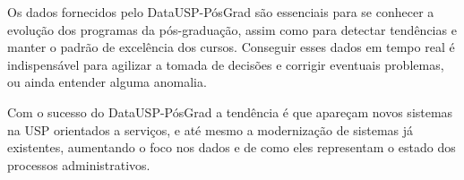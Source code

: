 \par Os dados fornecidos pelo DataUSP-PósGrad são essenciais para se conhecer a evolução dos programas da pós-graduação, assim como para detectar tendências e manter o padrão de excelência dos cursos. Conseguir esses dados em tempo real é indispensável para agilizar a tomada de decisões e corrigir eventuais problemas, ou ainda entender alguma anomalia.

\par Com o sucesso do DataUSP-PósGrad a tendência é que apareçam novos sistemas na USP orientados a serviços, e até mesmo a modernização de sistemas já existentes, aumentando o foco nos dados e de como eles representam o estado dos processos administrativos.
